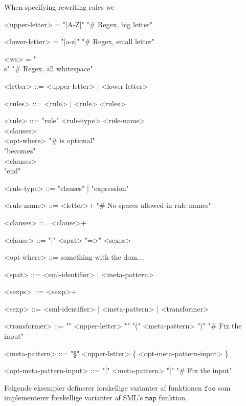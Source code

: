 \documentclass[oneside]{memoir}
\theoremstyle{definition}
\begin{document}
When specifying rewriting rules we 

\setlength{\grammarindent}{7.3em}
\begin{grammar} 
 
  <upper-letter> = "[A-Z]" \hfill "# Regex, big letter"

  <lower-letter> = "[a-z]" \hfill "# Regex, small letter"

  <ws> = "\\s" \hfill "\# Regex, all whitespace"

  <letter> ::= <upper-letter> | <lower-letter>

  <rules> ::= <rule> | <rule> <rules>

  <rule> ::= "rule" <rule-type> <rule-name> \\
             \hspace*{1em} <clauses> \\
             <opt-where> \hfill "\# is optional" \\
             "becomes" \\
             \hspace*{1em} <clauses> \\
             "end"

  <rule-type> ::= "clauses" | "expression" 

  <rule-name> ::= <letter>+ \hfill "\# No spaces allowed in rule-names"

  <clauses> ::= <clause>+

  <clause> ::= "|" <spat> "=>" <sexps>

  <opt-where> ::= something with the dom....

  <spat> ::= <sml-identifier> | <meta-pattern>

  <sexps>  ::= <sexp>+
  
  <sexp>   ::= <sml-identifier> | <meta-pattern> | <transformer>

  <transformer> ::= "{" <upper-letter> "}" "(" <meta-pattern> ")" \hfill "\# Fix the input"

  <meta-pattern> ::= "§" <upper-letter> \{ <opt-meta-pattern-input> \}

  <opt-meta-pattern-input> ::= "[" <meta-pattern> "]" \hfill "\# Fix the input"

\end{grammar}


Følgende eksempler definerer forskellige varianter af funktionen $\texttt{foo}$
som implementerer forskellige varianter af SML's $\texttt{map}$ funktion.
\end{document}
